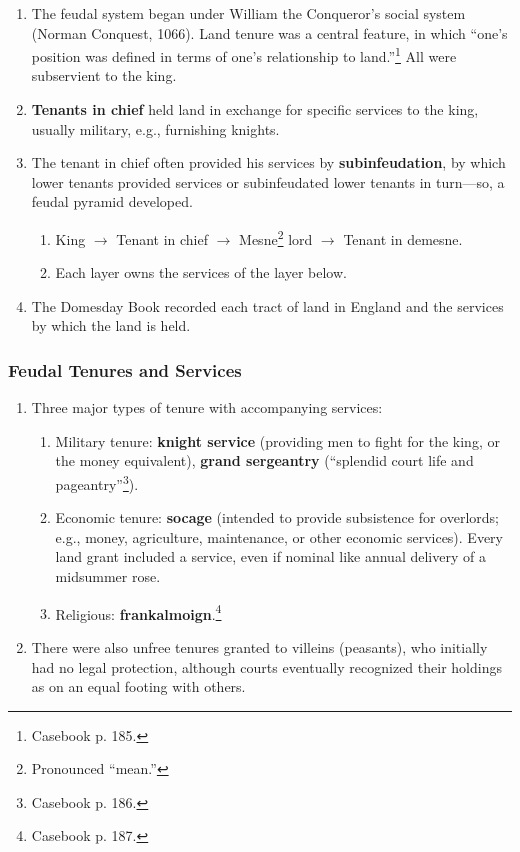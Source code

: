 \begin{enumerate}
    \item The feudal system began under William the Conqueror's social system 
    (Norman Conquest, 1066). Land tenure was a central feature, in which 
    ``one's position was defined in terms of one's relationship to 
    land.''\footnote{Casebook p. 185.} All were subservient to the king.
    \item \textbf{Tenants in chief} held land in exchange for specific 
    services to the king, usually military, e.g., furnishing knights.
    \item The tenant in chief often provided his services by 
    \textbf{subinfeudation}, by which lower tenants provided services or 
    subinfeudated lower tenants in turn---so, a feudal pyramid developed.
    \begin{enumerate}
        \item King $\rightarrow$ Tenant in chief $\rightarrow$ 
        Mesne\footnote{Pronounced ``mean.''} lord $\rightarrow$ Tenant in 
        demesne.
        \item Each layer owns the services of the layer below.
    \end{enumerate}
    \item The Domesday Book recorded each tract of land in England and the 
    services by which the land is held.
\end{enumerate}

\subsubsection{Feudal Tenures and Services}

\begin{enumerate}
    \item Three major types of tenure with accompanying services:
    \begin{enumerate}
        \item Military tenure: \textbf{knight service} (providing men to fight 
        for the king, or the money equivalent), \textbf{grand sergeantry} 
        (``splendid court life and pageantry''\footnote{Casebook p. 186.}).
        \item Economic tenure: \textbf{socage} (intended to provide 
        subsistence for overlords; e.g., money, agriculture, maintenance, or 
        other economic services). Every land grant included a service, even if 
        nominal like annual delivery of a midsummer rose.
        \item Religious: \textbf{frankalmoign}.\footnote{Casebook p. 187.}
    \end{enumerate}
    \item There were also unfree tenures granted to villeins (peasants), who 
    initially had no legal protection, although courts eventually recognized 
    their holdings as on an equal footing with others.
\end{enumerate}

